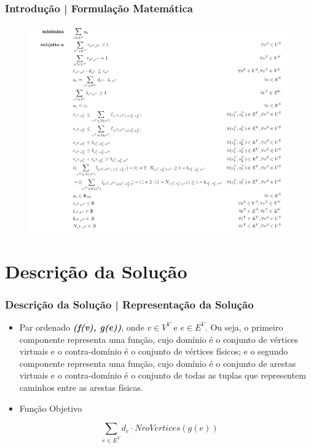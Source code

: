 \documentclass{beamer}
\begin{document}
\begin{frame}
\frametitle{Introdução | Formulação Matemática}
\begin{figure}
\includegraphics[scale=0.35]{prog_linear}
\end{figure}
\end{frame}

\section{Descrição da Solução}

\begin{frame}
\frametitle{Descrição da Solução | Representação da Solução}
\begin{itemize}
\item Par ordenado \textbf{\emph{(f(v), g(e))}}, onde \textbf{\emph{\(v \in V^{V}\)}} e \textbf{\emph{\(e \in E^{V}\)}}. Ou seja, o primeiro componente representa uma função, cujo domínio é o conjunto de vértices virtuais e o contra-domínio é o conjunto de vértices físicos; e o segundo componente representa uma função, cujo domínio é o conjunto de arestas virtuais e o contra-domínio é o conjunto de todas as tuplas que representem caminhos entre as arestas físicas.
\item Função Objetivo
\end{itemize}

\begin{displaymath}
\sum_{e \in E^{V}} d_{e} \cdot NroVertices(g(e))
\end{displaymath}
\end{frame}
\end{document}
